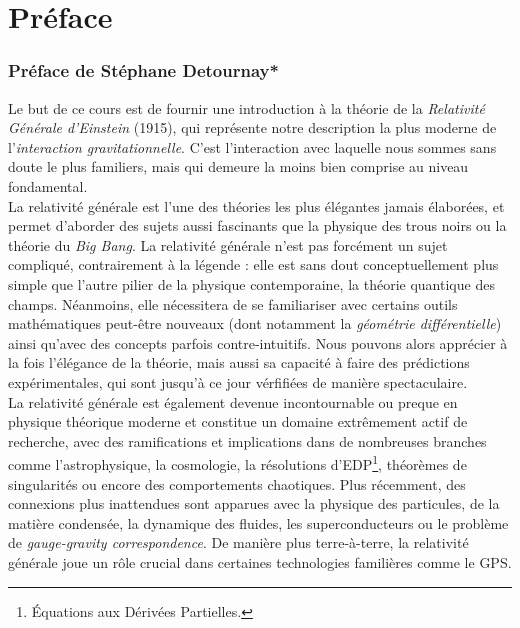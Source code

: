 \section*{Préface}

\subsubsection{Préface de Stéphane Detournay*}
Le but de ce cours est de fournir une introduction à la théorie de la \emph{Relativité Générale d'Einstein} (1915), qui représente notre description la plus moderne de l'\emph{interaction gravitationnelle}. C'est l'interaction avec laquelle nous sommes sans doute le plus familiers, mais qui demeure la moins bien comprise au niveau fondamental.\\

La relativité générale est l'une des théories les plus élégantes jamais élaborées, et permet d'aborder des sujets aussi fascinants que la physique des trous noirs ou la théorie du \emph{Big Bang}. La relativité générale n'est pas forcément un sujet compliqué, contrairement à la légende : elle est sans dout conceptuellement plus simple que l'autre pilier de la physique contemporaine, la théorie quantique des champs. Néanmoins, elle nécessitera de se familiariser avec certains outils mathématiques peut-être nouveaux (dont notamment la \emph{géométrie différentielle}) ainsi qu'avec des concepts parfois contre-intuitifs. Nous pouvons alors apprécier à la fois l'élégance de la théorie, mais aussi sa capacité à faire des prédictions expérimentales, qui sont jusqu'à ce jour vérfifiées de manière spectaculaire.\\

La relativité générale est également devenue incontournable ou preque en physique théorique moderne et constitue un domaine extrêmement actif de recherche, avec des ramifications et implications dans de nombreuses branches comme l'astrophysique, la cosmologie, la résolutions d'EDP\footnote{Équations aux Dérivées Partielles.}, théorèmes de singularités ou encore des comportements chaotiques. Plus récemment, des connexions plus inattendues sont apparues avec la physique des particules, de la matière condensée, la dynamique des fluides, les superconducteurs ou le problème de \emph{gauge-gravity correspondence}. De manière plus terre-à-terre, la relativité générale joue un rôle crucial dans certaines technologies familières comme le GPS. \\

